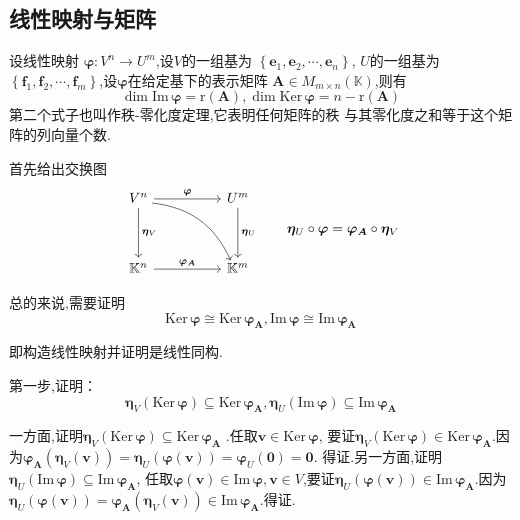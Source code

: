 \subsection{线性映射与矩阵}
\begin{formal}
\begin{theorem}[像空间与核空间的维数]\label{thm:像空间与核空间的维数}
    设线性映射
    $\bm{\varphi}:V^n\longrightarrow U^m $,设$V$的一组基为
    $\left\{\bm{e}_1,\bm{e}_2,\cdots,\bm{e}_n\right\}$,
    $U$的一组基为$\left\{\bm{f}_1,\bm{f}_2,\cdots,\bm{f}_m
    \right\}$,设$\bm{\varphi}$在给定基下的表示矩阵
    $\bm{A}\in M_{m\times n}\left(\mathbb{K}
    \right)$,则有
    \[
    \dim \mathrm{Im}\,\bm{\varphi}=\mathrm{r}\left(\bm{A}\right)
    ,
    \dim \mathrm{Ker}\,\bm{\varphi}=n-\mathrm{r}\left(\bm{A}\right)
    \]
    第二个式子也叫作秩-零化度定理,它表明任何矩阵的秩
    与其零化度之和等于这个矩阵的列向量个数.
\end{theorem}
\begin{Proof}
首先给出交换图
 \[
        \begin{tikzcd}
V^n \arrow[rr, "\bm{\varphi}"] \arrow[dd, "\bm{\eta}_V"] \arrow[rrdd, bend left, shift right] &  & U^m \arrow[dd, "\bm{\eta}_U"] \\
                                                                                    &  &                          \\
\mathbb{K}^n \arrow[rr, "\bm{\varphi}_{\bm{A}}"]                                              &  & \mathbb{K}^m            
\end{tikzcd}
\qquad
\bm{\eta}_U\circ \bm{\varphi}=\bm{\varphi}_{\bm{A}}\circ \bm{\eta}_V
\]

总的来说,需要证明
\[
\mathrm{Ker}\,\bm{\varphi}\cong \mathrm{Ker}\,\bm{\varphi}_{\bm{A}},
\mathrm{Im}\,\bm{\varphi}\cong \mathrm{Im}\,\bm{\varphi}_{\bm{A}}
\]

即构造线性映射并证明是线性同构.

第一步,证明：
\[
\bm{\eta}_V\left(\mathrm{Ker}\,\bm{\varphi}
\right)\subseteq \mathrm{Ker}\,\bm{\varphi}_{\bm{A}},
\bm{\eta}_U\left(\mathrm{Im}\,\bm{\varphi}
\right)\subseteq \mathrm{Im}\,\bm{\varphi}_{\bm{A}}
\]

一方面,证明$\bm{\eta}_V\left(\mathrm{Ker}\,\bm{\varphi}
\right)\subseteq \mathrm{Ker}\,\bm{\varphi}_{\bm{A}}$
.任取$\bm{v}\in \mathrm{Ker}\,\bm{\varphi}$,
要证$\bm{\eta}_V\left(
    \mathrm{Ker}\,\bm{\varphi}
\right)\in \mathrm{Ker}\,\bm{\varphi}
_{\bm{A}}$.因为$\bm{\varphi}_{\bm{A}}\left(\bm{\eta}_V\left(\bm{v}\right)\right)=
\bm{\eta}_U\left(\bm{\varphi}\left(\bm{v}\right)\right)=\bm{\varphi}_U\left(\bm{0}\right)=\bm{0}.$
得证.另一方面,证明
$\bm{\eta}_U\left(\mathrm{Im}\,\bm{\varphi}
\right)\subseteq \mathrm{Im}\,\bm{\varphi}_{\bm{A}}
$,
任取$\bm{\varphi}\left(\bm{v}\right)\in \mathrm{Im}\,\bm{\varphi},
\bm{v}\in V$,要证$ \bm{\eta}_U\left(\bm{\varphi}\left(\bm{v}\right)\right)\in \mathrm{Im}\,\bm{\varphi}_{\bm{A}}.
$因为$\bm{\eta}_U\left(\bm{\varphi}\left(\bm{v}\right)\right)=
\bm{\varphi}_{\bm{A}}\left(\bm{\eta}_V\left(\bm{v}\right)\right)\in \mathrm{Im}\,\bm{\varphi}_{\bm{A}}
.$得证.


\end{Proof}
\end{formal}
